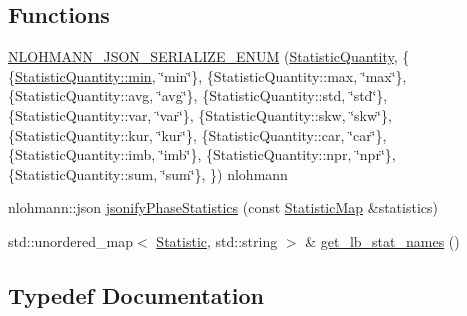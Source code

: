 \subsection*{Functions}
\begin{DoxyCompactItemize}
\item 
\hyperlink{namespacevt_1_1vrt_1_1collection_1_1lb_aeb7ccb2ce4711e921658f65fef098f82}{N\+L\+O\+H\+M\+A\+N\+N\+\_\+\+J\+S\+O\+N\+\_\+\+S\+E\+R\+I\+A\+L\+I\+Z\+E\+\_\+\+E\+N\+UM} (\hyperlink{namespacevt_1_1vrt_1_1collection_1_1lb_a74989c7b4dd16fcc067e90a29cd1febe}{Statistic\+Quantity}, \{ \{\hyperlink{namespacevt_1_1vrt_1_1collection_1_1lb_a74989c7b4dd16fcc067e90a29cd1febead8bd79cc131920d5de426f914d17405a}{Statistic\+Quantity\+::min}, \char`\"{}min\char`\"{}\}, \{Statistic\+Quantity\+::max, \char`\"{}max\char`\"{}\}, \{Statistic\+Quantity\+::avg, \char`\"{}avg\char`\"{}\}, \{Statistic\+Quantity\+::std, \char`\"{}std\char`\"{}\}, \{Statistic\+Quantity\+::var, \char`\"{}var\char`\"{}\}, \{Statistic\+Quantity\+::skw, \char`\"{}skw\char`\"{}\}, \{Statistic\+Quantity\+::kur, \char`\"{}kur\char`\"{}\}, \{Statistic\+Quantity\+::car, \char`\"{}car\char`\"{}\}, \{Statistic\+Quantity\+::imb, \char`\"{}imb\char`\"{}\}, \{Statistic\+Quantity\+::npr, \char`\"{}npr\char`\"{}\}, \{Statistic\+Quantity\+::sum, \char`\"{}sum\char`\"{}\}, \}) nlohmann
\item 
nlohmann\+::json \hyperlink{namespacevt_1_1vrt_1_1collection_1_1lb_a1f9a043bb30515a07d13308e214c1385}{jsonify\+Phase\+Statistics} (const \hyperlink{namespacevt_1_1vrt_1_1collection_1_1lb_a497ad83ef5825f2ea18ed20a228870d3}{Statistic\+Map} \&statistics)
\item 
std\+::unordered\+\_\+map$<$ \hyperlink{namespacevt_1_1vrt_1_1collection_1_1lb_af0e20ef9afee77295053aa83bf1348b1}{Statistic}, std\+::string $>$ \& \hyperlink{namespacevt_1_1vrt_1_1collection_1_1lb_acd98c4a6bcb5725976e9cdd7f0d611bf}{get\+\_\+lb\+\_\+stat\+\_\+names} ()
\end{DoxyCompactItemize}


\subsection{Typedef Documentation}
\mbox{\label{namespacevt_1_1vrt_1_1collection_1_1lb_a497ad83ef5825f2ea18ed20a228870d3}} 

